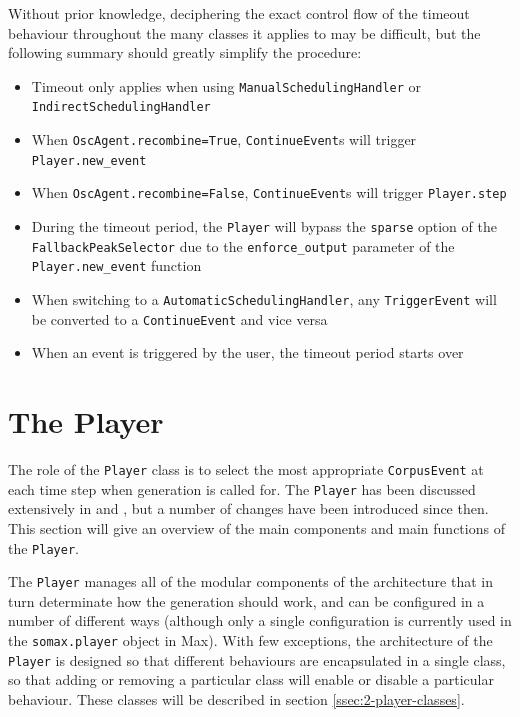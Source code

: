 Without prior knowledge, deciphering the exact control flow of the timeout behaviour throughout the many classes it applies to may be difficult, but the following summary should greatly simplify the procedure:

\begin{itemize}
	\item Timeout only applies when using \texttt{ManualSchedulingHandler} or \texttt{IndirectSchedulingHandler} 
	\item When \texttt{OscAgent.recombine=True}, \texttt{ContinueEvent}s will trigger \texttt{Player.new\_event}
	\item When \texttt{OscAgent.recombine=False}, \texttt{ContinueEvent}s will trigger \texttt{Player.step}
	\item During the timeout period, the \texttt{Player} will bypass the \texttt{sparse} option of the \texttt{FallbackPeakSelector} due to the \texttt{enforce\_output} parameter of the \texttt{Player.new\_event} function
	\item When switching to a \texttt{AutomaticSchedulingHandler}, any \texttt{TriggerEvent} will be converted to a \texttt{ContinueEvent} and vice versa
	\item When an event is triggered by the user, the timeout period starts over
\end{itemize}








\section{The Player}\label{ssec:2-player}

The role of the \texttt{Player} class is to select the most appropriate \texttt{CorpusEvent} at each time step when generation is called for. The \texttt{Player} has been discussed extensively in \cite{somaxtheory2021} and \cite{somaxsoftware2021}, but a number of changes have been introduced since then. This section will give an overview of the main components and main functions of the \texttt{Player}.

The \texttt{Player} manages all of the modular components of the architecture that in turn determinate how the generation should work, and can be configured in a number of different ways (although only a single configuration is currently used in the \texttt{somax.player} object in Max). With few exceptions, the architecture of the \texttt{Player} is designed so that different behaviours are encapsulated in a single class, so that adding or removing a particular class will enable or disable a particular behaviour. These classes will be described in section \ref{ssec:2-player-classes}.

